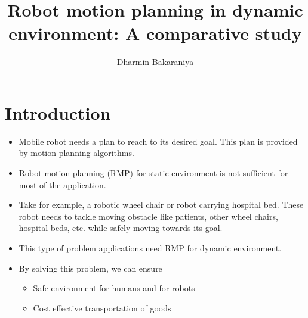 \documentclass[rnd]{mas_proposal}
\title{Robot motion planning in dynamic environment: A comparative study}
\author{Dharmin Bakaraniya}
\begin{document}
\maketitle

\pagestyle{plain}

\chapter{Introduction}
\begin{itemize}
    \item Mobile robot needs a plan to reach to its desired goal. This plan is provided by motion planning algorithms.
    \item Robot motion planning (RMP) for static environment is not sufficient for most of the application.
    \item Take for example, a robotic wheel chair or robot carrying hospital bed. These robot needs to tackle moving obstacle like patients, other wheel chairs, hospital beds, etc. while safely moving towards its goal.
    \item This type of problem applications need RMP for dynamic environment. 
    \item By solving this problem, we can ensure 
        \begin{itemize}
            \item Safe environment for humans and for robots
            \item Cost effective transportation of goods
        \end{itemize}
\end{itemize}
\end{document}
